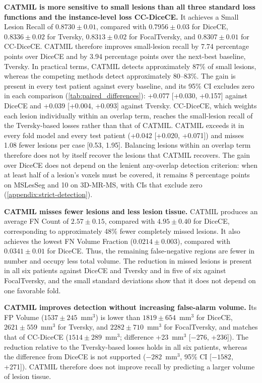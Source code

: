 \textbf{CATMIL is more sensitive to small lesions than all three standard
loss functions and the instance-level loss CC-DiceCE.} It achieves a Small
Lesion Recall of $0.8730 \pm 0.01$, compared with $0.7956 \pm 0.03$ for
DiceCE, $0.8336 \pm 0.02$ for Tversky, $0.8313 \pm 0.02$ for FocalTversky,
and $0.8307 \pm 0.01$ for CC-DiceCE. CATMIL therefore improves
small-lesion recall by 7.74 percentage points over DiceCE and by 3.94
percentage points over the next-best baseline, Tversky. In practical terms,
CATMIL detects approximately 87\% of small lesions, whereas the competing
methods detect approximately 80--83\%. The gain is present in every test
patient against every baseline, and its 95\% CI excludes zero in each
comparison (\cref{tab:paired_differences}): +0.077 [+0.030, +0.157] against
DiceCE and +0.039 [+0.004, +0.093] against Tversky. CC-DiceCE, which
weights each lesion individually within an overlap term, reaches the
small-lesion recall of the Tversky-based losses rather than that of CATMIL.
CATMIL exceeds it in every fold model and every test patient (+0.042
[+0.020, +0.071]) and misses 1.08 fewer lesions per case [0.53, 1.95].
Balancing lesions within an overlap term therefore does not by itself
recover the lesions that CATMIL recovers. The gain over DiceCE
does not depend on the lenient any-overlap detection criterion: when at
least half of a lesion's voxels must be covered, it remains 8 percentage
points on MSLesSeg and 10 on 3D-MR-MS, with CIs that exclude zero
(\cref{appendix:strict-detection}).

\textbf{CATMIL misses fewer lesions and less lesion tissue.} CATMIL
produces an average FN Count of $2.57 \pm 0.15$, compared with
$4.95 \pm 0.40$ for DiceCE, corresponding to approximately 48\% fewer
completely missed lesions. It also achieves the lowest FN Volume Fraction
($0.0214 \pm 0.003$), compared with $0.0341 \pm 0.01$ for DiceCE. Thus, the
remaining false-negative regions are fewer in number and occupy less total
volume. The reduction in missed lesions is present in all six patients
against DiceCE and Tversky and in five of six against FocalTversky, and the
small standard deviations show that it does not depend on one favorable
fold.

\textbf{CATMIL improves detection without increasing false-alarm volume.}
Its FP Volume ($1537 \pm 245$~mm$^3$) is lower than
$1819 \pm 654$~mm$^3$ for DiceCE, $2621 \pm 559$~mm$^3$ for Tversky, and
$2282 \pm 710$~mm$^3$ for FocalTversky, and matches that of CC-DiceCE
($1514 \pm 289$~mm$^3$; difference +23~mm$^3$ [$-276$, +236]). The
reduction relative to the Tversky-based losses holds in all six patients,
whereas the difference from DiceCE is not supported ($-282$~mm$^3$, 95\% CI
[$-1582$, +271]). CATMIL therefore does not improve recall by predicting a
larger volume of lesion tissue.

